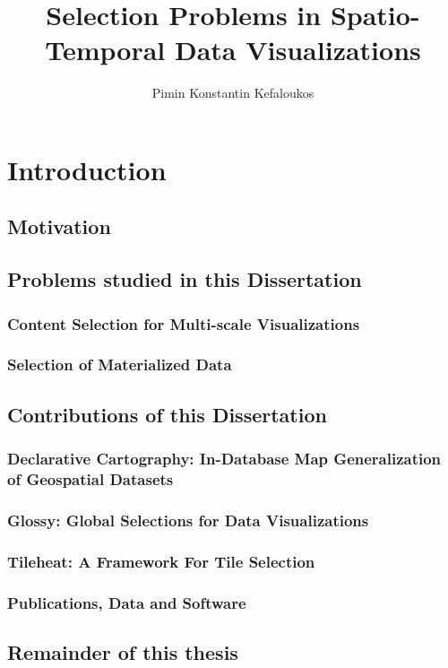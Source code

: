 \documentclass[11pt, oneside]{report}   	%
\title{Selection Problems in Spatio-Temporal Data Visualizations}
\author{Pimin Konstantin Kefaloukos}
\begin{document}
\maketitle

\tableofcontents


\chapter{Introduction}
\section{Motivation}
\section{Problems studied in this Dissertation}
\subsection{Content Selection for Multi-scale Visualizations}
\subsection{Selection of Materialized Data}
\section{Contributions of this Dissertation}
\subsection{Declarative Cartography: In-Database Map Generalization of Geospatial Datasets}
\subsection{Glossy: Global Selections for Data Visualizations}
\subsection{Tileheat: A Framework For Tile Selection}
\subsection{Publications, Data and Software}
\section{Remainder of this thesis}
\end{document}
